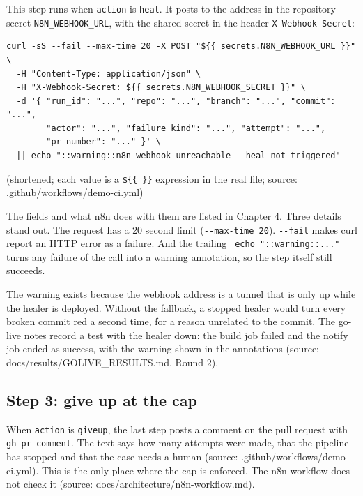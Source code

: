 \documentclass[11pt,a4paper]{report}
\begin{document}
This step runs when \texttt{action} is \texttt{heal}. It posts to the address in the repository secret \texttt{N8N\_\allowbreak{}WEBHOOK\_\allowbreak{}URL}, with the shared secret in the header \texttt{X-\allowbreak{}Webhook-\allowbreak{}Secret}:

\begin{lstlisting}
curl -sS --fail --max-time 20 -X POST "${{ secrets.N8N_WEBHOOK_URL }}" \
  -H "Content-Type: application/json" \
  -H "X-Webhook-Secret: ${{ secrets.N8N_WEBHOOK_SECRET }}" \
  -d '{ "run_id": "...", "repo": "...", "branch": "...", "commit": "...",
        "actor": "...", "failure_kind": "...", "attempt": "...",
        "pr_number": "..." }' \
  || echo "::warning::n8n webhook unreachable - heal not triggered"
\end{lstlisting}

(shortened; each value is a \texttt{\$\{\{ \}\}} expression in the real file; source: .github/workflows/demo-ci.yml)

The fields and what n8n does with them are listed in Chapter 4. Three details stand out. The request has a 20 second limit (\texttt{-\allowbreak{}-\allowbreak{}max-\allowbreak{}time 20}). \texttt{-\allowbreak{}-\allowbreak{}fail} makes curl report an HTTP error as a failure. And the trailing \texttt{\textbar{}\textbar{} echo "::warning::.\allowbreak{}.\allowbreak{}.\allowbreak{}"} turns any failure of the call into a warning annotation, so the step itself still succeeds.

The warning exists because the webhook address is a tunnel that is only up while the healer is deployed. Without the fallback, a stopped healer would turn every broken commit red a second time, for a reason unrelated to the commit. The go-live notes record a test with the healer down: the build job failed and the notify job ended as success, with the warning shown in the annotations (source: docs/results/GOLIVE\_RESULTS.md, Round 2).

\subsection{Step 3: give up at the cap}

When \texttt{action} is \texttt{giveup}, the last step posts a comment on the pull request with \texttt{gh pr comment}. The text says how many attempts were made, that the pipeline has stopped and that the case needs a human (source: .github/workflows/demo-ci.yml). This is the only place where the cap is enforced. The n8n workflow does not check it (source: docs/architecture/n8n-workflow.md).
\end{document}
